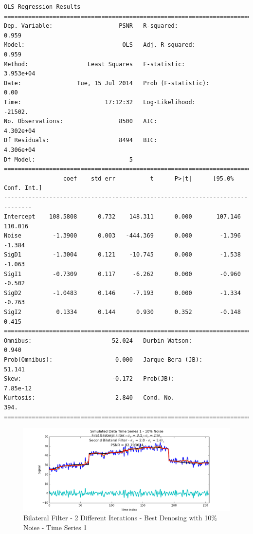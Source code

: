 \documentclass[11pt]{article}
\theoremstyle{definition}
\begin{document}
{\begin{lstlisting}[caption = Time Series 3 - Bilateral Filter 2 Different Iterations OLS Model, label = {2diffbilateral3}]
                            OLS Regression Results                            
==============================================================================
Dep. Variable:                   PSNR   R-squared:                       0.959
Model:                            OLS   Adj. R-squared:                  0.959
Method:                 Least Squares   F-statistic:                 3.953e+04
Date:                Tue, 15 Jul 2014   Prob (F-statistic):               0.00
Time:                        17:12:32   Log-Likelihood:                -21502.
No. Observations:                8500   AIC:                         4.302e+04
Df Residuals:                    8494   BIC:                         4.306e+04
Df Model:                           5                                         
==============================================================================
                 coef    std err          t      P>|t|      [95.0% Conf. Int.]
------------------------------------------------------------------------------
Intercept    108.5808      0.732    148.311      0.000       107.146   110.016
Noise         -1.3900      0.003   -444.369      0.000        -1.396    -1.384
SigD1         -1.3004      0.121    -10.745      0.000        -1.538    -1.063
SigI1         -0.7309      0.117     -6.262      0.000        -0.960    -0.502
SigD2         -1.0483      0.146     -7.193      0.000        -1.334    -0.763
SigI2          0.1334      0.144      0.930      0.352        -0.148     0.415
==============================================================================
Omnibus:                       52.024   Durbin-Watson:                   0.940
Prob(Omnibus):                  0.000   Jarque-Bera (JB):               51.141
Skew:                          -0.172   Prob(JB):                     7.85e-12
Kurtosis:                       2.840   Cond. No.                         394.
==============================================================================
\end{lstlisting}
}

\begin{figure}
\centering
\includegraphics[width = 0.75 \textwidth]{2DiffBilateralSignal1Best.png}
\caption{Bilateral Filter - 2 Different Iterations - Best Denosing with 10\% Noise - Time Series 1}
\label{2diffbilateral1best}
\end{figure}
\end{document}
